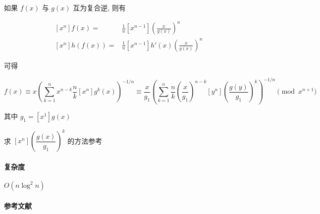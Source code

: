 如果 \(f(x)\) 与 \(g(x)\) 互为复合逆, 则有

\[
    \begin{aligned}
        \left[x^n\right]f(x)=&\frac{1}{n}\left[x^{n-1}\right]\left(\frac{x}{g(x)}\right)^n \\
        \left[x^n\right]h(f(x))=&\frac{1}{n}\left[x^{n-1}\right]h'(x)\left(\frac{x}{g(x)}\right)^n
    \end{aligned}
\]

可得

\[
    f(x)\equiv x\left(\sum_{k=1}^nx^{n-k}\frac{n}{k}\left[x^n\right]g^k(x)\right)^{-1/n}\equiv \frac{x}{g_1}\left(\sum_{k=1}^n\frac{n}{k}\left(\frac{x}{g_1}\right)^{n-k}\left[y^n\right]\left(\frac{g(y)}{g_1}\right)^k\right)^{-1/n}\pmod{x^{n + 1}} 
\]

其中 \(g_1=\left[x^1\right]g(x)\)

求 \(\left[x^n\right]\left(\dfrac{g(x)}{g_1}\right)^k\) 的方法参考 

\paragraph{复杂度} \(O(n\log^2 n)\)

\paragraph{参考文献} \cite{kinoshita2024power} \cite{antileafstandard}
